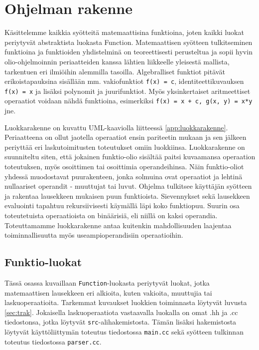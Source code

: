 \documentclass[10pt,a4paper]{article}
\begin{document}
\section{Ohjelman rakenne}
\label{sec:ohjelman_rakenne}
Käsittelemme kaikkia syötteitä matemaattisina funktioina, joten kaikki luokat periytyvät abstraktista
luokasta Function. Matemaattisen syötteen tulkitseminen funktioina ja funktioiden yhdistelminä on
teoreettisesti perusteltua ja sopii hyvin olio-ohjelmoinnin periaatteiden kanssa lähtien liikkeelle
yleisestä mallista, tarkentuen eri ilmiöihin alemmilla tasoilla. Algebralliset funktiot pitävät
erikoistapauksina sisällään mm. vakiofunktiot \lstinline!f(x) = c!, identiteettikuvauksen
\lstinline!f(x) = x! ja lisäksi
polynomit ja juurifunktiot. Myös yksinkertaiset aritmeettiset operaatiot voidaan nähdä funktioina,
esimerkiksi \lstinline!f(x) = x + c, g(x, y) = x*y! jne.

Luokkarakenne on kuvattu UML-kaaviolla liitteessä \ref{app:luokkarakenne}. Periaatteena on ollut
jaotella operaatiot ensin pariteetin mukaan ja sen jälkeen periyttää eri laskutoimitusten
toteutukset omiin luokkiinsa. Luokkarakenne on suunniteltu siten, että jokainen funktio-olio
sisältää paitsi kuvaamansa operaation toteutuksen, myös osoittimen tai osoittimia operandeihinsa.
Näin funktio-oliot yhdessä muodostavat puurakenteen, jonka solmuina ovat operaatiot ja lehtinä
nullaariset operandit - muuttujat tai luvut.
Ohjelma tulkitsee käyttäjän syötteen ja rakentaa lausekkeen mukaisen
puun funktioista. Sievennykset sekä lausekkeen evaluointi tapahtuu rekursiivisesti käymällä läpi
koko funktiopuu.
Suurin osa toteutetuista operaatioista on binäärisiä, eli niillä on kaksi operandia. Toteuttamamme
luokkarakenne antaa kuitenkin mahdollisuuden laajentaa toiminnallisuutta myös useampioperandisiin
operaatioihin.

\subsection{Funktio-luokat}
Tässä osassa kuvaillaan \lstinline!Function!-luokasta periytyvät luokat, jotka matemaattisen lausekkeen eri alkioita, kuten vakioita, muuttujia tai laskuoperaatioita. Tarkemmat kuvaukset luokkien toiminnasta löytyvät luvusta \ref{sec:trak}.
Jokaisella laskuoperaatiota vastaavalla luokalla on omat .hh ja .cc tiedostonsa, jotka löytyvät
\texttt{src}-alihakemistosta. Tämän lisäksi hakemistosta löytyvät käyttöliittymän toteutus tiedostossa
\texttt{main.cc} sekä syötteen tulkinnan toteutus tiedostossa \texttt{parser.cc}.
\end{document}
